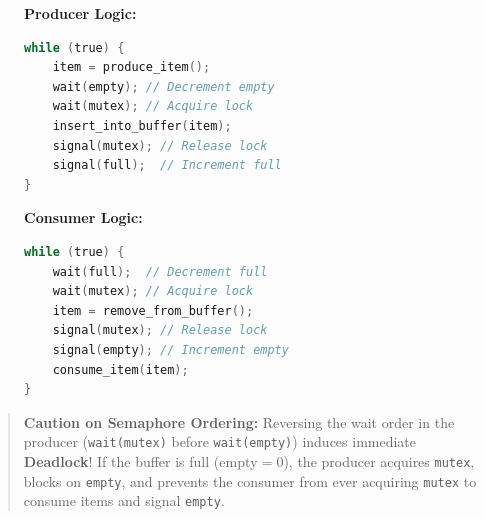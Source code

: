 \begin{figure}[htbp]
\centering
\begin{tcolorbox}[colback=codebg, colframe=primary, title=\textbf{Producer-Consumer Concurrency Algorithm}]
\begin{minipage}[t]{0.48\textwidth}
\textbf{Producer Logic:}
\begin{lstlisting}[language=C]
while (true) {
    item = produce_item();
    wait(empty); // Decrement empty
    wait(mutex); // Acquire lock
    insert_into_buffer(item);
    signal(mutex); // Release lock
    signal(full);  // Increment full
}
\end{lstlisting}
\end{minipage}
\hfill
\begin{minipage}[t]{0.48\textwidth}
\textbf{Consumer Logic:}
\begin{lstlisting}[language=C]
while (true) {
    wait(full);  // Decrement full
    wait(mutex); // Acquire lock
    item = remove_from_buffer();
    signal(mutex); // Release lock
    signal(empty); // Increment empty
    consume_item(item);
}
\end{lstlisting}
\end{minipage}
\end{tcolorbox}
\end{figure}

\begin{quote}
\textbf{Caution on Semaphore Ordering:} Reversing the wait order in the producer (\texttt{wait(mutex)} before \texttt{wait(empty)}) induces immediate \textbf{Deadlock}! If the buffer is full ($\text{empty} = 0$), the producer acquires \texttt{mutex}, blocks on \texttt{empty}, and prevents the consumer from ever acquiring \texttt{mutex} to consume items and signal \texttt{empty}.
\end{quote}

